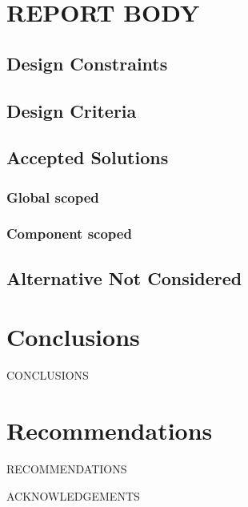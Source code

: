 \documentclass[12pt]{article}
\begin{document}

\section{REPORT BODY}
\subsection{Design Constraints}

\subsection{Design Criteria}

\subsection{Accepted Solutions}
\subsubsection{Global scoped}
\subsubsection{Component scoped}

\subsection{Alternative Not Considered}

\section{Conclusions}
CONCLUSIONS


\section{Recommendations}
RECOMMENDATIONS


\newpage



\newpage


ACKNOWLEDGEMENTS
\newpage


\end{document}
